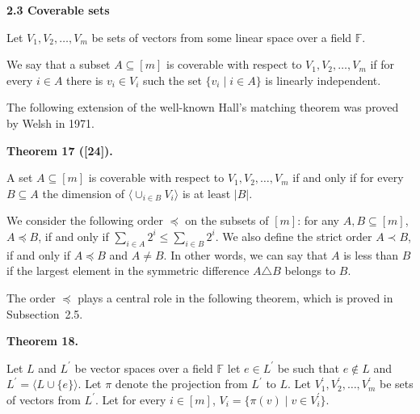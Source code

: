 \documentclass[10pt,a4paper]{article}
\begin{document}
\par\medskip\noindent\textbf{
2.3 Coverable sets}\par


Let $V_{1},V_{2},\dots,V_{m}$ be sets of vectors from some linear space over a field $\mathbb{F}$.\par



We say that a subset $A\subseteq[m]$ is coverable with respect to $V_{1},V_{2},\dots,V_{m}$ if for every $i\in A$ there is $v_{i}\in V_{i}$ such the set $\{v_{i}\mid i\in A\}$ is linearly independent.\par



The following extension of the well-known Hall’s matching theorem was proved by Welsh in 1971.\par



\par\medskip\noindent\textbf{
Theorem 17 ([24]).
}\par



A set $A\subseteq[m]$ is coverable with respect to $V_{1},V_{2},\dots,V_{m}$ if and only if for every $B\subseteq A$ the dimension of $\langle\cup_{i\in B}V_{i}\rangle$ is at least $|B|$.\par




We consider the following order $\preceq$ on the subsets of $[m]$: for any $A,B\subseteq[m]$, $A\preceq B$, if and only if $\sum_{i\in A}2^{i}\leq\sum_{i\in B}2^{i}$. We also define the strict order $A\prec B$, if and only if $A\preceq B$ and $A\neq B$. In other words, we can say that $A$ is less than $B$ if the largest element in the symmetric difference $A\triangle B$ belongs to $B$.\par



The order $\preceq$ plays a central role in the following theorem, which is proved in Subsection 2.5.\par



\par\medskip\noindent\textbf{
Theorem 18.
}\par



Let $L$ and $L^{\prime}$ be vector spaces over a field $\mathbb{F}$ let $e\in L^{\prime}$ be such that $e\notin L$ and $L^{\prime}=\langle L\cup\{e\}\rangle$. Let
$\pi$ denote the projection from $L^{\prime}$ to $L$. Let $V^{\prime}_{1},V^{\prime}_{2},\dots,V^{\prime}_{m}$ be sets of vectors from $L^{\prime}$.
Let for every $i\in[m]$, $V_{i}=\{\pi(v)\mid v\in V_{i}^{\prime}\}$.\par
\end{document}
